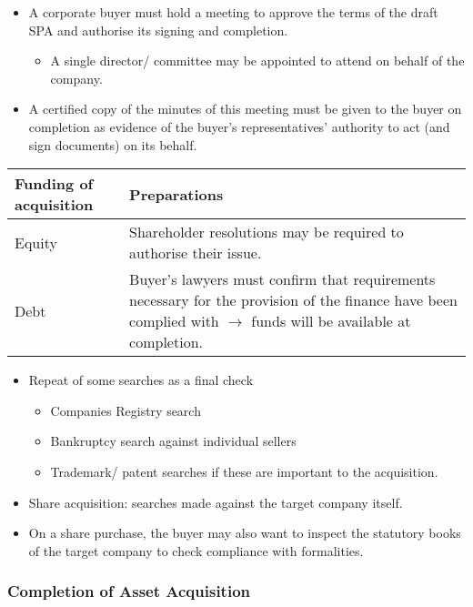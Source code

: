 \documentclass[
]{article}
\providecommand{\tightlist}{%
  \setlength{\itemsep}{0pt}\setlength{\parskip}{0pt}}
\begin{document}
\begin{itemize}
\tightlist
\item
  A corporate buyer must hold a meeting to approve the terms of the
  draft SPA and authorise its signing and completion.

  \begin{itemize}
  \tightlist
  \item
    A single director/ committee may be appointed to attend on behalf of
    the company.
  \end{itemize}
\item
  A certified copy of the minutes of this meeting must be given to the
  buyer on completion as evidence of the buyer's representatives'
  authority to act (and sign documents) on its behalf.
\end{itemize}

\begin{longtable}[]{@{}ll@{}}
\toprule()
Funding of acquisition & Preparations \\
\midrule()
\endhead
Equity & Shareholder resolutions may be required to authorise their
issue. \\
Debt & Buyer's lawyers must confirm that requirements necessary for the
provision of the finance have been complied with {\(\rightarrow\)} funds
will be available at completion. \\
\bottomrule()
\end{longtable}

\begin{itemize}
\tightlist
\item
  Repeat of some searches as a final check

  \begin{itemize}
  \tightlist
  \item
    Companies Registry search
  \item
    Bankruptcy search against individual sellers
  \item
    Trademark/ patent searches if these are important to the
    acquisition.
  \end{itemize}
\item
  Share acquisition: searches made against the target company itself.
\item
  On a share purchase, the buyer may also want to inspect the statutory
  books of the target company to check compliance with formalities.
\end{itemize}

\hypertarget{completion-of-asset-acquisition}{%
\subsubsection{Completion of Asset
Acquisition}\label{completion-of-asset-acquisition}}
\end{document}
